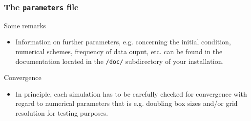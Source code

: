 \documentclass[9pt]{beamer}
\begin{document}
\begin{frame}[fragile]
  \frametitle{The {\tt parameters} file}

\begin{block}

\begin{exampleblock}{Some remarks}

\begin{itemize}
\item Information on further parameters, e.g. concerning the initial condition,
numerical schemes, frequency of data ouput, etc. can be found in the \gene
documentation located in the {\tt /doc/} subdirectory of your \gene installation.
\end{itemize}
\end{exampleblock}

\begin{alertblock}{Convergence}

\begin{itemize}
\item In principle, each simulation has to be carefully checked for convergence with regard
to numerical parameters that is e.g. doubling box sizes and/or grid resolution for
testing purposes.
\end{itemize}
\end{alertblock}

\end{block}

\end{frame}

\end{document}

